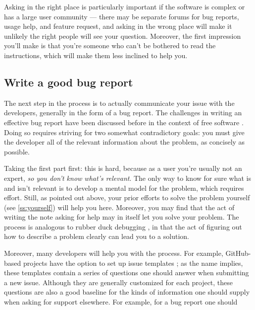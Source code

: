 \documentclass[9pt,training,pubversion]{livecoms}
\begin{document}
Asking in the right place is particularly important if the software is complex
or has a large user community --- there may be separate forums for bug reports,
usage help, and feature request, and asking in the wrong place will make it
unlikely the right people will see your question. Moreover, the first impression
you'll make is that you're someone who can't be bothered to read the
instructions, which will make them less inclined to help you.

\subsection{Write a good bug report}

The next step in the process is to actually communicate your issue with the
developers, generally in the form of a bug report.  The challenges in writing an
effective bug report have been discussed before in the context of free software
\cite{Raymond, Tatham}.  Doing so requires striving for two somewhat
contradictory goals: you must give the developer all of the relevant information
about the problem, as concisely as possible.

Taking the first part first: this is hard, because as a user you're usually not
an expert, \emph{so you don't know what's relevant}. The only way to know for
sure what is and isn't relevant is to develop a mental model for the problem,
which requires effort. Still, as pointed out above, your prior efforts to solve
the problem yourself (see \ref{ss:yourself}) will help you here.  Moreover, you
may find that the act of writing the note asking for help may in itself let you
solve your problem. The process is analogous to rubber duck debugging
\cite{Thomas-1999}, in that the act of figuring out how to describe a problem
clearly can lead you to a solution.

Moreover, many developers will help you with the process. For example,
GitHub-based projects have the option to set up issue templates
\cite{github-templates}; as the name implies, these templates contain a series
of questions one should answer when submitting a new issue. Although they are
generally customized for each project, these questions are also a good baseline
for the kinds of information one should supply when asking for support
elsewhere. For example, for a bug report one should
\end{document}
